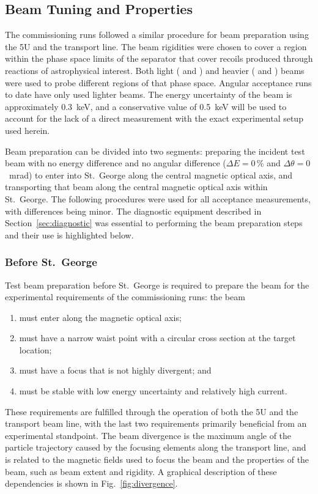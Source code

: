 \subsection{Beam Tuning and Properties}
\label{sec:tuning}

The commissioning runs followed a similar procedure for beam preparation
using the 5U and the transport line. The beam rigidities were chosen to
cover a region within the phase space limits of the separator that cover
recoils produced through reactions of astrophysical interest. Both light
( and ) and heavier ( and )
beams were used to probe different regions of that phase space. Angular
acceptance runs to date have only used lighter beams. The energy
uncertainty of the beam is approximately 0.3~keV, and a conservative
value of 0.5~keV will be used to account for the lack of a direct
measurement with the exact experimental setup used herein.

Beam preparation can be divided into two segments: preparing the
incident test beam with no energy difference and no angular difference
($\Delta E = 0$\,\% and $\Delta\theta = 0$~mrad) to enter into St.\
George along the central magnetic optical axis, and transporting that
beam along the central magnetic optical axis within St.\ George. The
following procedures were used for all acceptance measurements, with
differences being minor. The diagnostic equipment described in
Section~\ref{sec:diagnostic} was essential to performing the beam
preparation steps and their use is highlighted below.

\subsubsection{Before St.\ George}

Test beam preparation before St.\ George is required to prepare the beam
for the experimental requirements of the commissioning runs: the beam
\begin{enumerate}[leftmargin=2\parindent]
    \item must enter along the magnetic optical axis;
    \item must have a narrow waist point with a circular cross section
        at the target location;
    \item must have a focus that is not highly divergent; and
    \item must be stable with low energy uncertainty and relatively high
        current.
\end{enumerate}
These requirements are fulfilled through the operation of both the 5U
and the transport beam line, with the last two requirements primarily
beneficial from an experimental standpoint. The beam divergence is the
maximum angle of the particle trajectory caused by the focusing elements
along the transport line, and is related to the magnetic fields used to
focus the beam and the properties of the beam, such as beam extent and
rigidity. A graphical description of these dependencies is shown in
Fig.~\ref{fig:divergence}.

